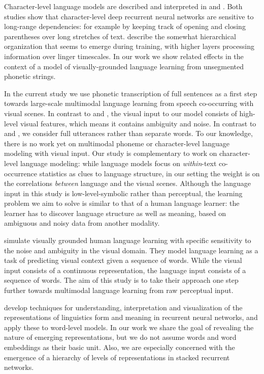 Character-level language models are described and interpreted in  and . Both studies show that character-level deep recurrent neural networks are sensitive to long-range dependencies: for example by keeping track of opening and closing parentheses over long stretches of text.  describe the somewhat hierarchical organization that seems to emerge during training, with higher layers processing information over linger timescales. In our work we show related effects in the context of a model of visually-grounded language learning from unsegmented phonetic strings.

In the current study we use phonetic transcription of full sentences as a first step towards large-scale multimodal language learning from speech co-occurring with visual scenes. In contrast to  and , the visual input to our model consists of high-level visual features, which means it contains ambiguity and noise. In contrast to  and  , we consider full utterances rather than separate words. To our knowledge, there is no work yet on multimodal phoneme or character-level language modeling with visual input. Our study is complementary to work on character-level language modeling: while language models focus on {\it within}-text co-occurrence statistics as clues to language structure, in our setting the weight is on the correlations  {\it between} language and the visual scenes. Although the language input in this study is low-level-symbolic rather than perceptual, the learning problem we aim to solve is similar to that of a human language learner: the learner has to discover language structure as well as meaning, based on ambiguous and noisy data from another modality.  

 simulate visually grounded human language learning with specific sensitivity to the noise and ambiguity in the visual domain. They model language learning as a task of predicting visual context given a sequence of words. While the visual input consists of a continuous representation, the language input consists of a sequence of words. The aim of this study is to take their approach one step further towards multimodal language learning from raw perceptual input. 

 develop techniques for understanding, interpretation and visualization of the representations of linguistics form and meaning in recurrent neural networks, and apply these to word-level models. In our work we share the goal of revealing the nature of emerging representations, but we do not assume words and word embeddings as their basic unit. Also, we are especially concerned with the emergence of a hierarchy of levels of representations in stacked recurrent networks.

